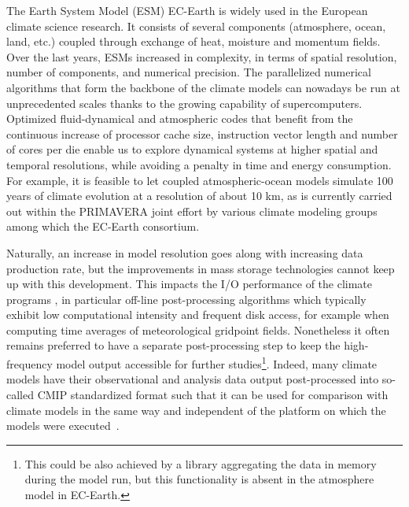 \documentclass[procedia]{easychair}
\begin{document}

The Earth System Model (ESM) EC-Earth \cite{ECEARTHv22} is widely used in the European climate science research. 
It consists of several components (atmosphere, ocean, land, etc.) coupled 
through exchange of heat, moisture and momentum fields. 
Over the last years, ESMs increased in complexity, in terms of spatial resolution, number of components, and numerical precision. 
%
The parallelized numerical algorithms that form the backbone of the climate models
can nowadays be run at unprecedented scales thanks to the
growing capability of supercomputers. 
Optimized fluid-dynamical and atmospheric codes that benefit from the continuous 
increase of processor cache size, instruction vector length and number of cores per die enable us to explore dynamical systems at higher 
spatial and temporal resolutions, while avoiding a penalty in time and energy consumption. For example, it is feasible to let coupled atmospheric-ocean 
models simulate 100 years of climate evolution at a resolution of about 10 km, as is currently carried out within the PRIMAVERA joint effort 
\cite{PRIMAVERA} by various climate modeling groups among which the EC-Earth consortium.

Naturally, an increase in model resolution goes along with increasing data production rate, but the improvements in mass storage technologies cannot keep up with this development.
This impacts the I/O performance of the climate programs \cite{Asif20142370}, in particular off-line post-processing algorithms which typically exhibit low computational intensity 
and frequent disk access, for example when computing time averages of meteorological gridpoint fields. 
Nonetheless it often remains preferred to 
have a separate post-processing step to keep the high-frequency model output accessible for further studies\footnote{This could be also achieved by a 
library aggregating the data in memory during the model run, but this functionality is absent in the atmosphere model in EC-Earth.}. 
Indeed, many climate models have their observational and analysis data output post-processed into so-called CMIP standardized format such that it can be used for comparison with climate models in
the same way and independent of the platform on which the models were executed~\cite{CMIP6}.
 
\end{document}
